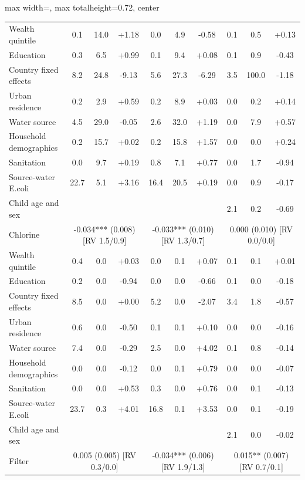 \begin{landscape}
\begin{table}[p]
\begin{adjustbox}{max width=\linewidth, max totalheight=0.72\textwidth, center}
\begin{tabular}{l|ccc|ccc|ccc}
\quad Wealth quintile & 0.1 & 14.0 & +1.18 & 0.0 & 4.9 & -0.58 & 0.1 & 0.5 & +0.13 \\
\quad Education & 0.3 & 6.5 & +0.99 & 0.1 & 9.4 & +0.08 & 0.1 & 0.9 & -0.43 \\
\quad Country fixed effects & 8.2 & 24.8 & -9.13 & 5.6 & 27.3 & -6.29 & 3.5 & 100.0 & -1.18 \\
\quad Urban residence & 0.2 & 2.9 & +0.59 & 0.2 & 8.9 & +0.03 & 0.0 & 0.2 & +0.14 \\
\quad Water source & 4.5 & 29.0 & -0.05 & 2.6 & 32.0 & +1.19 & 0.0 & 7.9 & +0.57 \\
\quad Household demographics & 0.2 & 15.7 & +0.02 & 0.2 & 15.8 & +1.57 & 0.0 & 0.0 & +0.24 \\
\quad Sanitation & 0.0 & 9.7 & +0.19 & 0.8 & 7.1 & +0.77 & 0.0 & 1.7 & -0.94 \\
\quad Source-water E.coli & 22.7 & 5.1 & +3.16 & 16.4 & 20.5 & +0.19 & 0.0 & 0.9 & -0.17 \\
\quad Child age and sex &  &  &  &  &  &  & 2.1 & 0.2 & -0.69 \\
\midrule
Chlorine & \multicolumn{3}{c}{-0.034*** (0.008) {\scriptsize[RV 1.5/0.9]}} & \multicolumn{3}{c}{-0.033*** (0.010) {\scriptsize[RV 1.3/0.7]}} & \multicolumn{3}{c}{0.000 (0.010) {\scriptsize[RV 0.0/0.0]}} \\
\quad Wealth quintile & 0.4 & 0.0 & +0.03 & 0.0 & 0.1 & +0.07 & 0.1 & 0.1 & +0.01 \\
\quad Education & 0.2 & 0.0 & -0.94 & 0.0 & 0.0 & -0.66 & 0.1 & 0.0 & -0.18 \\
\quad Country fixed effects & 8.5 & 0.0 & +0.00 & 5.2 & 0.0 & -2.07 & 3.4 & 1.8 & -0.57 \\
\quad Urban residence & 0.6 & 0.0 & -0.50 & 0.1 & 0.1 & +0.10 & 0.0 & 0.0 & -0.16 \\
\quad Water source & 7.4 & 0.0 & -0.29 & 2.5 & 0.0 & +4.02 & 0.1 & 0.8 & -0.14 \\
\quad Household demographics & 0.0 & 0.0 & -0.12 & 0.0 & 0.1 & +0.79 & 0.0 & 0.0 & -0.07 \\
\quad Sanitation & 0.0 & 0.0 & +0.53 & 0.3 & 0.0 & +0.76 & 0.0 & 0.1 & -0.13 \\
\quad Source-water E.coli & 23.7 & 0.3 & +4.01 & 16.8 & 0.1 & +3.53 & 0.0 & 0.1 & -0.19 \\
\quad Child age and sex &  &  &  &  &  &  & 2.1 & 0.0 & -0.02 \\
\midrule
Filter & \multicolumn{3}{c}{0.005 (0.005) {\scriptsize[RV 0.3/0.0]}} & \multicolumn{3}{c}{-0.034*** (0.006) {\scriptsize[RV 1.9/1.3]}} & \multicolumn{3}{c}{0.015** (0.007) {\scriptsize[RV 0.7/0.1]}} \\

\end{tabular}
\end{adjustbox}
\end{table}
\end{landscape}

